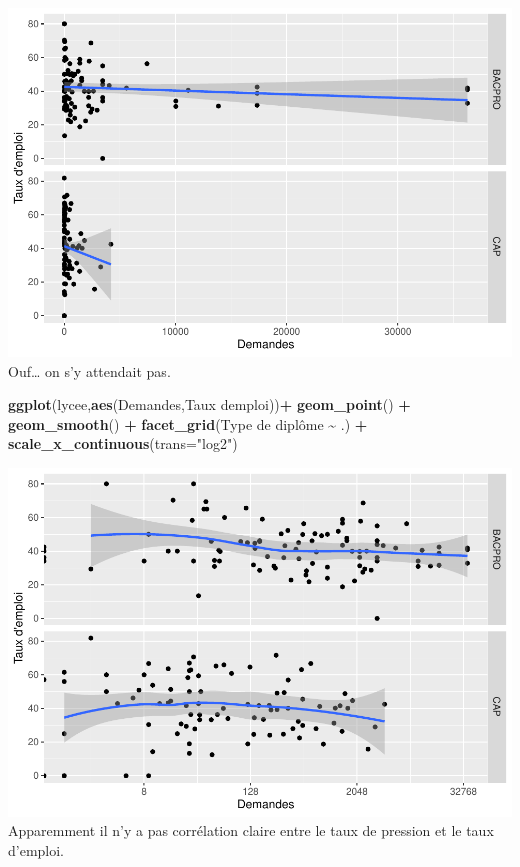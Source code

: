 \documentclass[
]{book}
\newenvironment{Shaded}{\begin{snugshade}}{\end{snugshade}}
\newcommand{\AttributeTok}[1]{\textcolor[rgb]{0.13,0.29,0.53}{#1}}
\newcommand{\FunctionTok}[1]{\textcolor[rgb]{0.13,0.29,0.53}{\textbf{#1}}}
\newcommand{\NormalTok}[1]{#1}
\newcommand{\SpecialCharTok}[1]{\textcolor[rgb]{0.81,0.36,0.00}{\textbf{#1}}}
\newcommand{\StringTok}[1]{\textcolor[rgb]{0.31,0.60,0.02}{#1}}
\begin{document}
\includegraphics{_main_files/figure-latex/lycee3-1.pdf}
Ouf\ldots{} on s'y attendait pas.

\begin{Shaded}
\begin{Highlighting}[]
\FunctionTok{ggplot}\NormalTok{(lycee,}\FunctionTok{aes}\NormalTok{(Demandes,}\StringTok{\textasciigrave{}}\AttributeTok{Taux d\textquotesingle{}emploi}\StringTok{\textasciigrave{}}\NormalTok{))}\SpecialCharTok{+}
  \FunctionTok{geom\_point}\NormalTok{() }\SpecialCharTok{+} \FunctionTok{geom\_smooth}\NormalTok{() }\SpecialCharTok{+} \FunctionTok{facet\_grid}\NormalTok{(}\StringTok{\textasciigrave{}}\AttributeTok{Type de diplôme}\StringTok{\textasciigrave{}} \SpecialCharTok{\textasciitilde{}}\NormalTok{ .) }\SpecialCharTok{+}
  \FunctionTok{scale\_x\_continuous}\NormalTok{(}\AttributeTok{trans=}\StringTok{"log2"}\NormalTok{)}
\end{Highlighting}
\end{Shaded}

\includegraphics{_main_files/figure-latex/lycee4-1.pdf}
Apparemment il n'y a pas corrélation claire entre le taux de pression et le taux d'emploi.
\end{document}
